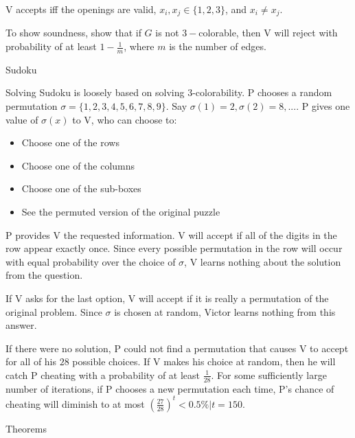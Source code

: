 \documentclass[2pt]{scrartcl}
\makeatletter
\renewcommand{\section}{\@startsection{section}{1}{0mm}
  {-1ex plus -.5ex minus -.2ex}
  {0.5ex plus .2ex}
{\normalfont\large\bfseries}}
\renewcommand{\subsection}{\@startsection{subsection}{2}{0mm}
  {-1explus -.5ex minus -.2ex}
  {0.5ex plus .2ex}
{\normalfont\normalsize\bfseries}}
\makeatother
\begin{document}
\begin{multicols}{6}
  V accepts iff the openings are valid, $x_i, x_j \in \{1, 2, 3\}$, and $x_i \neq x_j$.

  To show soundness, show that if $G$ is not $3-$colorable, then V will reject with probability of at least $1 - \frac{1}{m}$, where $m$ is the number of edges.

  \subsection{Sudoku}

  Solving Sudoku is loosely based on solving 3-colorability. P chooses a random permutation $\sigma = \{1, 2, 3, 4, 5, 6, 7, 8, 9\}$. Say $\sigma(1) = 2, \sigma(2) = 8, ...$. P gives one value of $\sigma(x)$ to V, who can choose to:
  
  \begin{itemize}
      \item Choose one of the rows
      \item Choose one of the columns
      \item Choose one of the sub-boxes
      \item See the permuted version of the original puzzle
  \end{itemize}
  
  P provides V the requested information. V will accept if all of the digits in the row appear exactly once. Since every possible permutation in the row will occur with equal probability over the choice of $\sigma$, V learns nothing about the solution from the question.
  
  If V asks for the last option, V will accept if it is really a permutation of the original problem. Since $\sigma$ is chosen at random, Victor learns nothing from this answer.
  
  If there were no solution, P could not find a permutation that causes V to accept for all of his $28$ possible choices. If V makes his choice at random, then he will catch P cheating with a probability of at least $\frac{1}{28}$. For some sufficiently large number of iterations, if P chooses a new permutation each time, P's chance of cheating will diminish to at most $(\frac{27}{28})^t < 0.5\%|t=150$.

  \section{Theorems}


\end{multicols}
\end{document}
